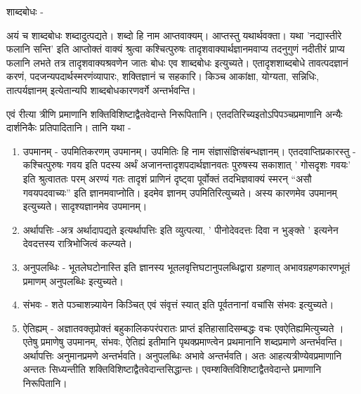 शाब्दबोधः -

अयं च शाब्दबोधः शब्दादुत्पद्यते। शब्दो हि नाम आप्तवाक्यम्। आप्तस्तु यथार्थवक्ता। यथा ’नद्यास्तीरे फलानि सन्ति’ इति आप्तोक्तं वाक्यं श्रुत्वा कश्चित्पुरुषः तादृशवाक्यार्थज्ञानमवाप्य तदनुगुणं नदीतीरं प्राप्य फलानि लभते तत्र तादृशवाक्यश्रवणेन जातः बोधः एव शाब्दबोधः इत्युच्यते। एतादृशशाब्दबोधे तावत्पदज्ञानं करणं, पदजन्यपदार्थस्मरणंव्यापारः, शक्तिज्ञानं च सहकारि। किञ्च आकांक्षा, योग्यता, सन्निधिः, तात्पर्यज्ञानम् इत्येतान्यपि शाब्दबोधकारणवर्गे अन्तर्भवन्ति।

एवं रीत्या त्रीणि प्रमाणानि शक्तिविशिष्टाद्वैतवेदान्ते निरूपितानि। एतदतिरिच्यइतोऽपिपञ्चप्रमाणानि अन्यैः दार्शनिकैः प्रतिपादितानि। तानि यथा -
\begin{enumerate}
\item उपमानम् - उपमितिकरणम् उपमानम्। उपमितिः हि नाम संज्ञासंज्ञिसंबन्धज्ञानम्। एतदवाप्तिप्रकारस्तु - कश्चित्पुरुषः गवय इति पदस्य अर्थं अजानन्तादृशपदार्थज्ञानवतः पुरुषस्य सकाशात् ’  गोसदृशः गवयः’ इति श्रुत्वाततः परम् अरण्यं गतः तादृशं प्राणिनं दृष्ट्वा पूर्वोक्तं तदभिज्ञवाक्यं स्मरन् “असौ गवयपदवाच्यः” इति ज्ञानमवाप्नोति। इदमेव ज्ञानम् उपमितिरित्युच्यते। अस्य कारणमेव उपमानम् इत्युच्यते। सादृश्यज्ञानमेव उपमानम्।
\item अर्थापत्तिः -अत्र अर्थादापद्यते इत्यर्थापत्तिः इति व्युत्पत्या, ’ पीनोदेवदत्तः दिवा न भुङ्क्ते ’ इत्यनेन देवदत्तस्य रात्रिभोजित्वं कल्प्यते।
\item अनुपलब्धिः - भूतलेघटोनास्ति इति ज्ञानस्य भूतलवृत्तिघटानुपलब्धिद्वारा ग्रहणात् अभावग्रहणकारणभूतं प्रमाणम् अनुपलब्धिः इत्युच्यते।
\item संभवः - शते पञ्चाशन्न्यायेन किञ्चित् एवं संवृत्तं स्यात् इति पूर्वतनानां वचांसि संभवः इत्युच्यते।
\item ऐतिह्यम् - अज्ञातवक्तृप्रोक्तं बहुकालिकपरंपरातः प्राप्तं इतिहासादिसम्बद्धः वचः एवऐतिह्यमित्युच्यते । एतेषु प्रमाणेषु उपमानम्, संभवः, ऐतिह्यं इतीमानि पृथक्प्रमाण्त्वेन प्रथमानानि शब्दप्रमाणे अन्तर्भवन्ति। अर्थापत्तिः अनुमानप्रमणे अन्तर्भवति। अनुपलब्धिः अभावे अन्तर्भवति। अतः आहत्यत्रीण्येवप्रमाणानि अन्ततः सिध्यन्तीति शक्तिविशिष्टाद्वैतवेदान्तसिद्धान्तः।
एवम्शक्तिविशिष्टाद्वैतवेदान्ते प्रमाणानि निरूपितानि।
\end{enumerate}
